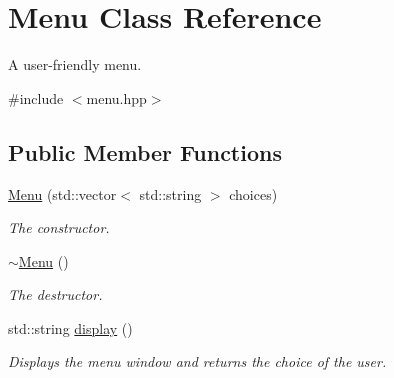 \hypertarget{class_menu}{\section{Menu Class Reference}
\label{class_menu}
}


A user-\/friendly menu.  




{\ttfamily \#include $<$menu.\-hpp$>$}

\subsection*{Public Member Functions}
\begin{DoxyCompactItemize}
\item 
\hyperlink{class_menu_afeb4cc8ef5e842a8ff061b8af05eb59b}{Menu} (std\-::vector$<$ std\-::string $>$ choices)
\begin{DoxyCompactList}\small\item\em The constructor. \end{DoxyCompactList}\item 
\hyperlink{class_menu_a831387f51358cfb88cd018e1777bc980}{$\sim$\-Menu} ()
\begin{DoxyCompactList}\small\item\em The destructor. \end{DoxyCompactList}\item 
std\-::string \hyperlink{class_menu_a8ab26ec1d2e2c4969cd7db9ff8ff4947}{display} ()
\begin{DoxyCompactList}\small\item\em Displays the menu window and returns the choice of the user. \end{DoxyCompactList}\end{DoxyCompactItemize}
